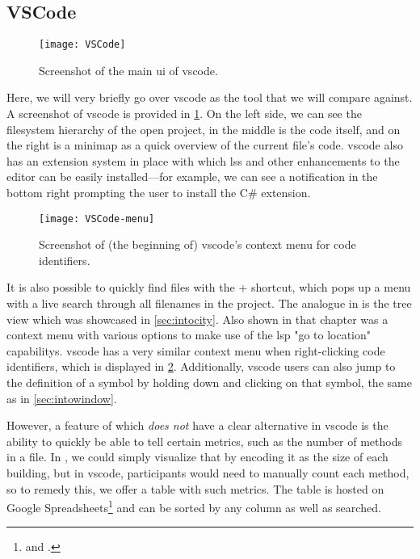 \documentclass[../thesis]{subfiles}
\begin{document}
\subsection{VSCode}\label{subsec:vscode}

\begin{figure}[htbp]
	\begin{center}
		\texttt{[image: VSCode]}
	\end{center}
	\caption{Screenshot of the main \gls{ui} of \gls{vscode}.}\label{fig:vscode}
\end{figure}

Here, we will very briefly go over \gls{vscode} as the tool that we will compare \SEE{} against.
A screenshot of \gls{vscode} is provided in \cref{fig:vscode}.
On the left side, we can see the filesystem hierarchy of the open project, in the middle is the code itself, and on the right is a minimap as a quick overview of the current file's code.
\gls{vscode} also has an extension system in place with which \glspl{ls} and other enhancements to the editor can be easily installed---for example, we can see a notification in the bottom right prompting the user to install the C\# extension.

\begin{figure}[htbp]
	\begin{center}
		\texttt{[image: VSCode-menu]}
	\end{center}
	\caption{Screenshot of (the beginning of) \gls{vscode}'s context menu for code identifiers.}\label{fig:vscode_menu}
\end{figure}

It is also possible to quickly find files with the  +  shortcut, which pops up a menu with a live search through all filenames in the project.
The analogue in \SEE{} is the tree view which was showcased in \cref{sec:intocity}.
Also shown in that chapter was a context menu with various options to make use of the \gls{lsp} "go to location" \glspl{capability}.
\Gls{vscode} has a very similar context menu when right-clicking code identifiers, which is displayed in \cref{fig:vscode_menu}.
Additionally, \gls{vscode} users can also jump to the definition of a symbol by holding down  and clicking on that symbol, the same as in \cref{sec:intowindow}.

However, a feature of \SEE{} which \emph{does not} have a clear alternative in \gls{vscode} is the ability to quickly be able to tell certain metrics, such as the number of methods in a file.
In \SEE{}, we could simply visualize that by encoding it as the size of each building, but in \gls{vscode}, participants would need to manually count each method, so to remedy this, we offer a table with such metrics.
The table is hosted on Google Spreadsheets\footnote{
	 and .
} and can be sorted by any column as well as searched.
\end{document}
